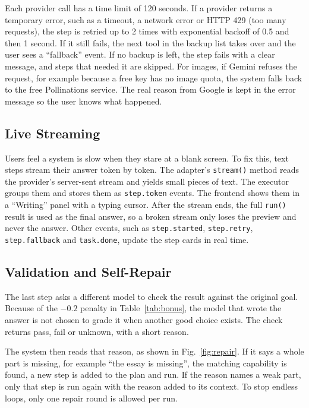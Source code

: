 \documentclass[conference]{IEEEtran}
\begin{document}
Each provider call has a time limit of 120 seconds. If a provider returns a temporary error, such as a
timeout, a network error or HTTP 429 (too many requests), the step is retried up to 2 times with
exponential backoff of 0.5 and then 1 second. If it still fails, the next tool in the backup list takes
over and the user sees a ``fallback'' event. If no backup is left, the step fails with a clear message,
and steps that needed it are skipped. For images, if Gemini refuses the request, for example because a
free key has no image quota, the system falls back to the free Pollinations service. The real reason
from Google is kept in the error message so the user knows what happened.

\subsection{Live Streaming}
Users feel a system is slow when they stare at a blank screen. To fix this, text steps stream their answer
token by token. The adapter's \texttt{stream()} method reads the provider's server-sent stream and yields
small pieces of text. The executor groups them and stores them as \texttt{step.token} events. The
frontend shows them in a ``Writing'' panel with a typing cursor. After the stream ends, the full
\texttt{run()} result is used as the final answer, so a broken stream only loses the preview and never the
answer. Other events, such as \texttt{step.started}, \texttt{step.retry}, \texttt{step.fallback} and
\texttt{task.done}, update the step cards in real time.

\subsection{Validation and Self-Repair}
The last step asks a different model to check the result against the original goal. Because of the
$-0.2$ penalty in Table~\ref{tab:bonus}, the model that wrote the answer is not chosen to grade it when
another good choice exists. The check returns pass, fail or unknown, with a short reason.

The system then reads that reason, as shown in Fig.~\ref{fig:repair}. If it says a whole part is
missing, for example ``the essay is missing'', the matching capability is found, a new step is added to
the plan and run. If the reason names a weak part, only that step is run again with the reason added to
its context. To stop endless loops, only one repair round is allowed per run.
\end{document}

